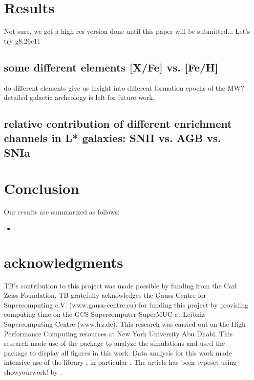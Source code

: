 \documentclass[useAMS,usenatbib]{mnras}
\begin{document}
\section{Results} \label{sec:results}

Not sure, we get a high res version done until this paper will be submitted...
Let's try g8.26e11


\subsection{some different elements [X/Fe] vs. [Fe/H]}
do different elements give us insight into different formation epochs of the MW?
detailed galactic archeology is left for future work.

\subsection{relative contribution of different enrichment channels in L* galaxies: SNII vs. AGB vs. SNIa}


\section{Conclusion}
\label{sec:conclusion}



Our results are summarized as follows:
\begin{itemize}
%
\item 

\end{itemize}



\section*{acknowledgments}
TB's contribution to this project was made possible by funding from the Carl Zeiss Foundation. TB gratefully acknowledges the Gauss Centre for Supercomputing e.V. (www.gauss-centre.eu) for funding this project by providing computing time on the GCS Supercomputer SuperMUC at Leibniz Supercomputing Centre (www.lrz.de). This research was carried out on the High Performance Computing resources at New York University Abu Dhabi.
This research made use of the {} \citet{pynbody} package to analyze the simulations and used the {} package {} \citep{matplotlib} to display all figures in this work. Data analysis for this work made intensive use of the {} library {} \citep{scipy}, in particular {} \citep{numpy,ipython}. The article has been typeset using showyourwork! by \citet{Luger2021}.






\label{lastpage}
\end{document}
